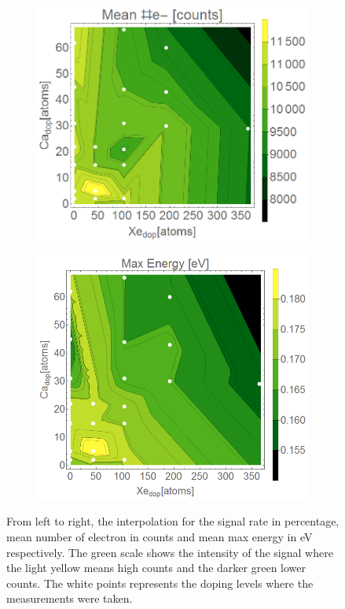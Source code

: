 \begin{figure}[h!]
\begin{subfigure}[l]{0.49\textwidth}
\includegraphics[width=1\textwidth]{../Images/results/MIR_He_XeCaDop/interpolationE2.png}   		
\end{subfigure}
\begin{subfigure}[l]{0.49\textwidth}
\includegraphics[width=1\textwidth]{../Images/results/MIR_He_XeCaDop/interpolationMax2.png}   	
	\end{subfigure}
\caption[MIR He-Xe-Ca doping. Interpolations]{From left to right, the interpolation for the signal rate in percentage, mean number of electron in counts and mean max energy in eV respectively. The green scale shows the intensity of the signal where the light yellow means high counts and the darker green lower counts. The white points represents the doping levels where the measurements were taken.}
\label{fig:XeCainterpolation}
\end{figure}

